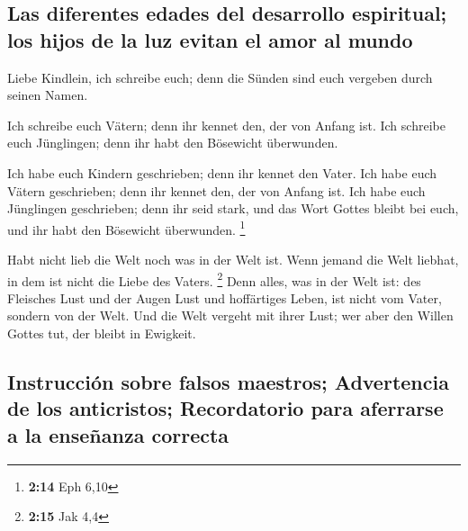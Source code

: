 \hypertarget{las-diferentes-edades-del-desarrollo-espiritual-los-hijos-de-la-luz-evitan-el-amor-al-mundo}{%
\subsection{Las diferentes edades del desarrollo espiritual; los hijos
de la luz evitan el amor al
mundo}\label{las-diferentes-edades-del-desarrollo-espiritual-los-hijos-de-la-luz-evitan-el-amor-al-mundo}}

 Liebe Kindlein, ich schreibe euch; denn die Sünden sind
euch vergeben durch seinen Namen.

 Ich schreibe euch Vätern; denn ihr kennet den, der von
Anfang ist. Ich schreibe euch Jünglingen; denn ihr habt den Bösewicht
überwunden.

 Ich habe euch Kindern geschrieben; denn ihr kennet den
Vater. Ich habe euch Vätern geschrieben; denn ihr kennet den, der von
Anfang ist. Ich habe euch Jünglingen geschrieben; denn ihr seid stark,
und das Wort Gottes bleibt bei euch, und ihr habt den Bösewicht
überwunden. \footnote{\textbf{2:14} Eph 6,10}

 Habt nicht lieb die Welt noch was in der Welt ist. Wenn
jemand die Welt liebhat, in dem ist nicht die Liebe des Vaters.
\footnote{\textbf{2:15} Jak 4,4}  Denn alles, was in der
Welt ist: des Fleisches Lust und der Augen Lust und hoffärtiges Leben,
ist nicht vom Vater, sondern von der Welt.  Und die Welt
vergeht mit ihrer Lust; wer aber den Willen Gottes tut, der bleibt in
Ewigkeit.

\hypertarget{instrucciuxf3n-sobre-falsos-maestros-advertencia-de-los-anticristos-recordatorio-para-aferrarse-a-la-enseuxf1anza-correcta}{%
\subsection{Instrucción sobre falsos maestros; Advertencia de los
anticristos; Recordatorio para aferrarse a la enseñanza
correcta}\label{instrucciuxf3n-sobre-falsos-maestros-advertencia-de-los-anticristos-recordatorio-para-aferrarse-a-la-enseuxf1anza-correcta}}

